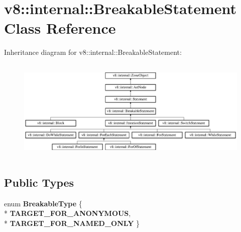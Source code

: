 \hypertarget{classv8_1_1internal_1_1_breakable_statement}{}\section{v8\+:\+:internal\+:\+:Breakable\+Statement Class Reference}
\label{classv8_1_1internal_1_1_breakable_statement}
Inheritance diagram for v8\+:\+:internal\+:\+:Breakable\+Statement\+:\begin{figure}[H]
\begin{center}
\leavevmode
\includegraphics[height=4.924623cm]{classv8_1_1internal_1_1_breakable_statement}
\end{center}
\end{figure}
\subsection*{Public Types}
\begin{DoxyCompactItemize}
\item 
enum {\bfseries Breakable\+Type} \{ \\*
{\bfseries T\+A\+R\+G\+E\+T\+\_\+\+F\+O\+R\+\_\+\+A\+N\+O\+N\+Y\+M\+O\+US}, 
\\*
{\bfseries T\+A\+R\+G\+E\+T\+\_\+\+F\+O\+R\+\_\+\+N\+A\+M\+E\+D\+\_\+\+O\+N\+LY}
 \}\hypertarget{classv8_1_1internal_1_1_breakable_statement_a52c50b4c3f6fd7f2ee085a03d6ab0f5d}{}\label{classv8_1_1internal_1_1_breakable_statement_a52c50b4c3f6fd7f2ee085a03d6ab0f5d}

\end{DoxyCompactItemize}

